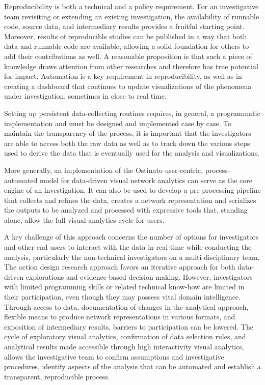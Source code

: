 Reproducibility is both a technical and a policy requirement. For an investigative team revisiting or extending an existing investigation, the availability of runnable code, source data, and intermediary results provides a fruitful starting point. Moreover, results of reproducible studies can be published in a way that both data and runnable code are available, allowing a solid foundation for others to add their contributions as well. A reasonable proposition is that such a piece of knowledge draws attention from other researches and therefore has true potential for impact. Automation is a key requirement in reproducibility, as well as in creating a dashboard that continues to update visualizations of the phenomena under investigation, sometimes in close to real time.  

Setting up persistent data-collecting routines requires, in general, a programmatic implementation and must be designed and implemented case by case. To maintain the transparency of the process, it is important that the investigators are able to access both the raw data as well as to track down the various steps used to derive the data that is eventually used for the analysis and visualizations.

More generally, an implementation of the Ostinato user-centric, process-automated model for data-driven visual network analytics can serve as the core engine of an investigation. It can also be used to develop a pre-processing pipeline that collects and refines the data, creates a network representation and serializes the outputs to be analyzed and processed with expressive tools that, standing alone, allow the full visual analytics cycle for users. 

A key challenge of this approach concerns the number of options for investigators and other end users to interact with the data in real-time while conducting the analysis, particularly the non-technical investigators on a multi-disciplinary team. The action design research approach favors an iterative approach for both data-driven explorations and evidence-based decision making. However, investigators with limited programming skills or related technical know-how are limited in their participation, even though they may possess vital domain intelligence. Through access to data, documentation of changes in the analytical approach, flexible means to produce network representations in various formats, and exposition of intermediary results, barriers to participation can be lowered. The cycle of exploratory visual analytics, confirmation of data selection rules, and analytical results made accessible through high interactivity visual analytics, allows the investigative team to confirm assumptions and investigative procedures, identify aspects of the analysis that can be automated and establish a transparent, reproducible process.